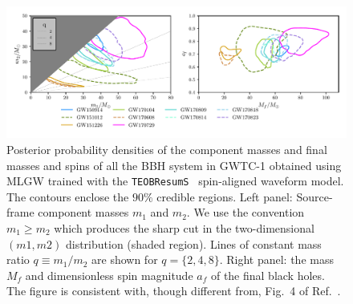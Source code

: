 \begin{figure}[t]
	\centering
    \includegraphics[width=\textwidth]{img/posterior_masses_final.pdf}
	\caption{
	Posterior probability densities of the component masses and final masses and spins 
	of all the BBH system in GWTC-1 obtained using MLGW trained with 
	the {\tt TEOBResumS}~\cite{Nagar:2020pcj} spin-aligned waveform model. 
	The contours enclose the $90\%$ credible regions. Left panel: Source-frame component 
	masses $m_1$ and $m_2$. We use the convention $m_1\geq m_2$ which produces 
	the sharp cut in the two-dimensional $(m1,m2)$ distribution (shaded region). Lines of
	constant mass ratio $q\equiv m_1/m_2$ are shown for $q=\{2,4,8\}$. Right panel: the mass $M_f$
	and dimensionless spin magnitude $a_f$ of the final black holes. The figure is consistent with, though 
	different from, Fig.~4 of Ref.~\cite{LIGOScientific:2018mvr}.
}
	\label{fig:gwtc1-summary}
\end{figure}

